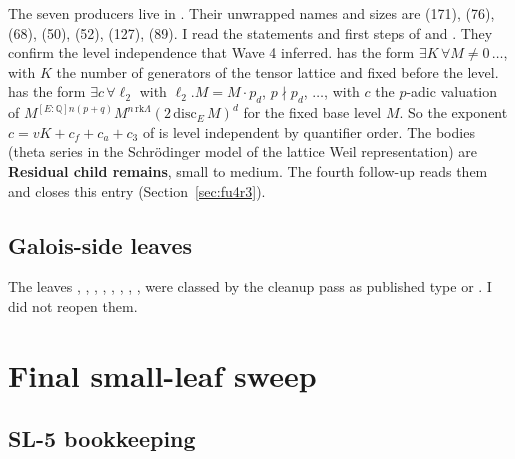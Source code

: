 \documentclass[11pt]{article}
\newcommand{\SL}[1]{\textsf{SL-#1}}
\newcommand{\sR}{\textbf{Residual child remains}}
\theoremstyle{remark}
\begin{document}
The seven producers live in . Their unwrapped names and sizes are  (171),  (76),  (68),  (50),  (52),  (127),  (89). I read the statements and first steps of  and . They confirm the level independence that Wave 4 inferred.  has the form $\exists K\,\forall M\ne0\,\dots$, with $K$ the number of generators of the tensor lattice  and fixed before the level.  has the form $\exists c\,\forall\ell_2$ with $\ell_2.M=M\cdot p_d$, $p\nmid p_d$, $\dots$, with $c$ the $p$-adic valuation of $M^{[E:\mathbb Q]n(p+q)}M^{n\,\mathrm{rk}\Lambda}(2\,\mathrm{disc}_E\,M)^d$ for the fixed base level $M$. So the exponent $c=vK+c_f+c_a+c_3$ of  is level independent by quantifier order. The bodies (theta series in the Schr\"odinger model of the lattice Weil representation) are \sR, small to medium. The fourth follow-up reads them and closes this entry (Section~\ref{sec:fu4r3}).

\subsection{Galois-side leaves}

The leaves , , , , , , , ,  were classed by the cleanup pass as published type or . I did not reopen them.

\section{Final small-leaf sweep}

\subsection{\SL{5} bookkeeping}
\end{document}
